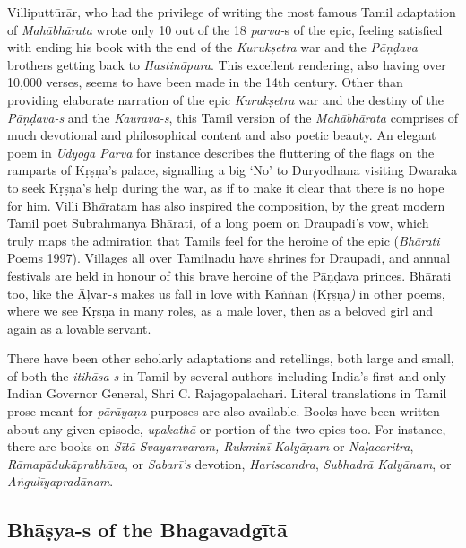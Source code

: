  \item Villiputtūrār, who had the privilege of writing the most famous Tamil adaptation of \textit{Mahābhārata} wrote only 10 out of the 18 \textit{parva-}s of the epic, feeling satisfied with ending his book with the end of the \textit{Kurukṣetra} war and the \textit{Pāṇḍava} brothers getting back to \textit{Hastināpura}. This excellent rendering, also having over 10,000 verses, seems to have been made in the 14th century. Other than providing elaborate narration of the epic \textit{Kurukṣetra} war and the destiny of the \textit{Pāṇḍava-s} and the \textit{Kaurava-s}, this Tamil version of the \textit{Mahābhārata} comprises of much devotional and philosophical content and also poetic beauty. An elegant poem in \textit{Udyoga Parva} for instance describes the fluttering of the flags on the ramparts of Kṛṣṇa’s palace, signalling a big ‘No’ to Duryodhana visiting Dwaraka to seek Kṛṣṇa’s help during the war, as if to make it clear that there is no hope for him. Villi Bh\textit{ā}ratam has also inspired the composition, by the great modern Tamil poet Subrahmanya Bhārati\textit{,} of a long poem on Draupadi’s vow, which truly maps the admiration that Tamils feel for the heroine of the epic (\textit{Bhārati} Poems 1997). Villages all over Tamilnadu have shrines for Draupadi\textit{,} and annual festivals are held in honour of this brave heroine of the Pāṇḍava princes. Bhārati too, like the Āļvār\textit{-s} makes us fall in love with Kaṅṅan (Kṛṣṇa\textit{)} in other poems, where we see Kṛṣṇa in many roles, as a male lover, then as a beloved girl and again as a lovable servant.

 \item There have been other scholarly adaptations and retellings, both large and small, of both the \textit{itihāsa-s} in Tamil by several authors including India’s first and only Indian Governor General, Shri C. Rajagopalachari. Literal translations in Tamil prose meant for \textit{pārāyaṇa} purposes are also available. Books have been written about any given episode, \textit{upakathā} or portion of the two epics too. For instance, there are books on \textit{Sītā Svayamvaram, Rukminī Kalyāṇam} or \textit{Naḷacaritra}, \textit{Rāmapādukāprabhāva}, or \textit{Sabarī’s} devotion, \textit{Hariscandra}, \textit{Subhadrā Kalyānam}, or \textit{Aṅgulīyapradānam}.



\subsection{Bhāṣya-s of the Bhagavadgītā}

